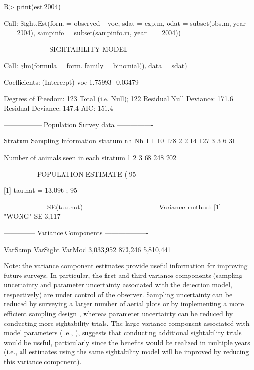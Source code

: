\documentclass[nojss]{jss}
\begin{document}
\begin{Schunk}
\begin{Sinput}
R> print(est.2004)
\end{Sinput}
\begin{Soutput}
Call:
Sight.Est(form = observed ~ voc, sdat = exp.m, odat = subset(obs.m,
    year == 2004), sampinfo = subset(sampinfo.m, year == 2004))

------------------- SIGHTABILITY MODEL ---------------------

Call:  glm(formula = form, family = binomial(), data = sdat)

Coefficients:
(Intercept)          voc
    1.75993     -0.03479

Degrees of Freedom: 123 Total (i.e. Null);  122 Residual
Null Deviance:      171.6
Residual Deviance: 147.4    AIC: 151.4

----------------- Population Survey data  ----------------

 Stratum Sampling Information
  stratum nh  Nh
1       1 10 178
2       2 14 127
3       3  6  31

 Number of animals seen in each stratum
  1   2   3
 68 248 202

-------------- POPULATION ESTIMATE ( 95 % CI) ----------------

[1] tau.hat =  13,096 ;   95 % CI = (  8,549 ,  21,430 )


------------------  SE(tau.hat) --------------------------------
Variance method: [1] "WONG"
   SE
3,117

-------------- Variance Components -------------------

  VarSamp  VarSight    VarMod
3,033,952   873,246 5,810,441
\end{Soutput}
\end{Schunk}
Note: the variance component estimates provide useful information
for improving future surveys.  In particular, the first and third
variance components (sampling uncertainty and parameter uncertainty
associated with the detection model, respectively) are under control
of the observer. Sampling uncertainty can be reduced by surveying a
larger number of aerial plots or by implementing a more efficient
sampling design \citep{FiebLenarz}, whereas parameter uncertainty
can be reduced by conducting more sightability trials. The large
variance component associated with model parameters (i.e.,
), suggests that conducting additional sightability
trials would be useful, particularly since the benefits would be
realized in multiple years (i.e., all estimates using the same
sightability model will be improved by reducing this variance
component).
\end{document}
